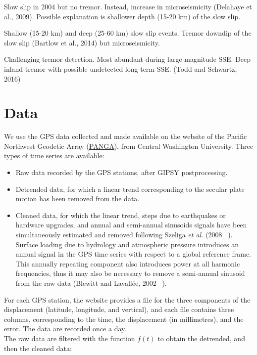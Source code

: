 \documentclass[main.tex]{subfiles}
\begin{document}
Slow slip in 2004 but no tremor. Instead, increase in microseismicity (Delahaye et al., 2009). Possible explanation is shallower depth (15-20 km) of the slow slip.

Shallow (15-20 km) and deep (25-60 km) slow slip events. Tremor downdip of the slow slip (Bartlow et al., 2014) but microseismicity.

Challenging tremor detection. Most abundant during large magnitude SSE. Deep inland tremor with possible undetected long-term SSE. (Todd and Schwartz, 2016)

\chapter{Data}

We use the GPS data collected and made available on the website of the Pacific Northwest Geodetic Array (\href{http://www.geodesy.cwu.edu/}{PANGA}), from Central Washington University. Three types of time series are available:

\begin{itemize}
\item Raw data recorded by the GPS stations, after GIPSY postprocessing.
\item Detrended data, for which a linear trend corresponding to the secular plate motion has been removed from the data.
\item Cleaned data, for which the linear trend, steps due to earthquakes or hardware upgrades, and annual and semi-annual sinusoids signals have been simultaneously estimated and removed following Szeliga \textit{et al.} (2008 ~\cite{SZE_2008}). Surface loading due to hydrology and atmospheric pressure introduces an annual signal in the GPS time series with respect to a global reference frame. This annually repeating component also introduces power at all harmonic frequencies, thus it may also be necessary to remove a semi-annual sinusoid from the raw data (Blewitt and Lavall\'ee, 2002 ~\cite{BLE_2002}).
\end{itemize}

For each GPS station, the website provides a file for the three components of the displacement (latitude, longitude, and vertical), and each file contains three columns, corresponding to the time, the displacement (in millimetres), and the error. The data are recorded once a day. \\

The raw data are filtered with the function $f (t)$ to obtain the detrended, and then the cleaned data:
\end{document}
